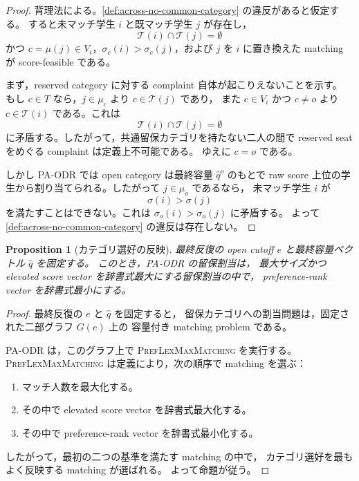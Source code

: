 \documentclass[
  12pt,
  a4paper,
  oneside,
  onecolumn,
  titlepage,
  final
]{jsarticle}
\newtheorem{proposition}{Proposition}
\newcommand{\1}{\mathbf{1}}
\begin{document}
\begin{proof}
背理法による。\cref{def:across-no-common-category} の違反があると仮定する。
すると未マッチ学生 $i$ と既マッチ学生 $j$ が存在し，
\[
    \mathcal T(i)\cap\mathcal T(j)=\emptyset
\]
かつ $c=\mu(j)\in V_i$，$\sigma_c(i)>\sigma_c(j)$，および $j$ を $i$ に置き換えた
matching が score-feasible である。

まず，reserved category に対する complaint 自体が起こりえないことを示す。
もし $c\in T$ なら，$j\in\mu_c$ より $c\in\mathcal T(j)$ であり，
また $c\in V_i$ かつ $c\neq o$ より $c\in\mathcal T(i)$ である。これは
\[
    \mathcal T(i)\cap\mathcal T(j)=\emptyset
\]
に矛盾する。したがって，共通留保カテゴリを持たない二人の間で
reserved seat をめぐる complaint は定義上不可能である。
ゆえに $c=o$ である。

しかし PA-ODR では open category は最終容量 $\hat q^o$ のもとで
raw score 上位の学生から割り当てられる。したがって $j\in\mu_o$ であるなら，
未マッチ学生 $i$ が
\[
    \sigma(i)>\sigma(j)
\]
を満たすことはできない。これは $\sigma_o(i)>\sigma_o(j)$ に矛盾する。
よって \cref{def:across-no-common-category} の違反は存在しない。
\end{proof}

\begin{proposition}[カテゴリ選好の反映]
\label{prop:pa-odr-preference}
最終反復の open cutoff $e$ と最終容量ベクトル $\hat q$ を固定する。
このとき，\textsc{PA-ODR} の留保割当は，
最大サイズかつ elevated score vector を辞書式最大にする留保割当の中で，
preference-rank vector を辞書式最小にする。
\end{proposition}

\begin{proof}
最終反復の $e$ と $\hat q$ を固定すると，
留保カテゴリへの割当問題は，固定された二部グラフ $G(e)$ 上の
容量付き matching problem である。

\textsc{PA-ODR} は，このグラフ上で
\textsc{PrefLexMaxMatching} を実行する。
\textsc{PrefLexMaxMatching} は定義により，次の順序で matching を選ぶ：
\begin{enumerate}
    \item マッチ人数を最大化する。
    \item その中で elevated score vector を辞書式最大化する。
    \item その中で preference-rank vector を辞書式最小化する。
\end{enumerate}

したがって，最初の二つの基準を満たす matching の中で，
カテゴリ選好を最もよく反映する matching が選ばれる。
よって命題が従う。
\end{proof}
\end{document}
